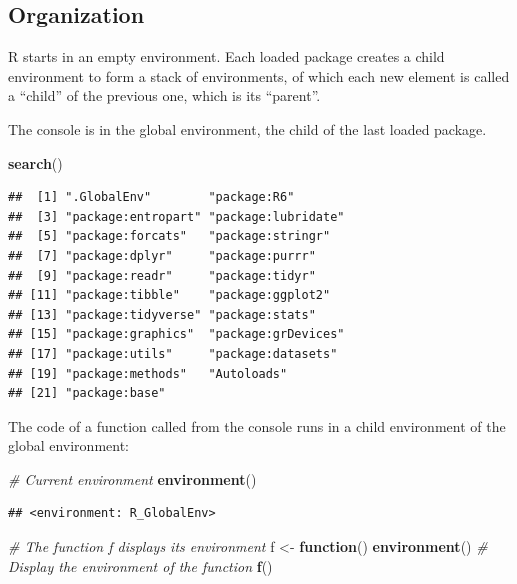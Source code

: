 \documentclass[
  12pt,
  american,
  a4paper,
  extrafontsizes,onecolumn,openright
  ]{memoir}
\newenvironment{Shaded}{\begin{snugshade}}{\end{snugshade}}
\newcommand{\CommentTok}[1]{\textcolor[rgb]{0.56,0.35,0.01}{\textit{#1}}}
\newcommand{\ControlFlowTok}[1]{\textcolor[rgb]{0.13,0.29,0.53}{\textbf{#1}}}
\newcommand{\FunctionTok}[1]{\textcolor[rgb]{0.13,0.29,0.53}{\textbf{#1}}}
\newcommand{\NormalTok}[1]{#1}
\newcommand{\OtherTok}[1]{\textcolor[rgb]{0.56,0.35,0.01}{#1}}
\begin{document}
\subsection{Organization}\label{organization}

R starts in an empty environment.
Each loaded package creates a child environment to form a stack of environments, of which each new element is called a \enquote{child} of the previous one, which is its \enquote{parent}.

The console is in the global environment, the child of the last loaded package.

\scriptsize

\begin{Shaded}
\begin{Highlighting}[]
\FunctionTok{search}\NormalTok{()}
\end{Highlighting}
\end{Shaded}

\begin{verbatim}
##  [1] ".GlobalEnv"        "package:R6"       
##  [3] "package:entropart" "package:lubridate"
##  [5] "package:forcats"   "package:stringr"  
##  [7] "package:dplyr"     "package:purrr"    
##  [9] "package:readr"     "package:tidyr"    
## [11] "package:tibble"    "package:ggplot2"  
## [13] "package:tidyverse" "package:stats"    
## [15] "package:graphics"  "package:grDevices"
## [17] "package:utils"     "package:datasets" 
## [19] "package:methods"   "Autoloads"        
## [21] "package:base"
\end{verbatim}

\normalsize

The code of a function called from the console runs in a child environment of the global environment:

\scriptsize

\begin{Shaded}
\begin{Highlighting}[]
\CommentTok{\# Current environment}
\FunctionTok{environment}\NormalTok{()}
\end{Highlighting}
\end{Shaded}

\begin{verbatim}
## <environment: R_GlobalEnv>
\end{verbatim}

\begin{Shaded}
\begin{Highlighting}[]
\CommentTok{\# The function f displays its environment}
\NormalTok{f }\OtherTok{\textless{}{-}} \ControlFlowTok{function}\NormalTok{() }\FunctionTok{environment}\NormalTok{()}
\CommentTok{\# Display the environment of the function}
\FunctionTok{f}\NormalTok{()}
\end{Highlighting}
\end{Shaded}
\end{document}
